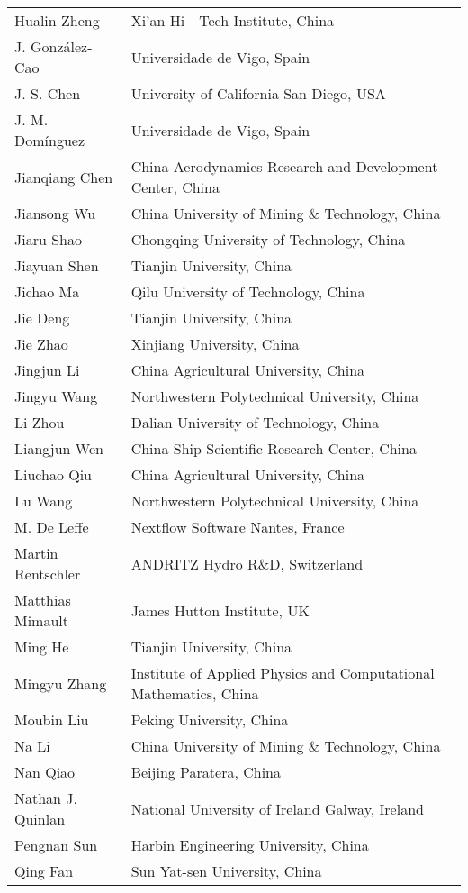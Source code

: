\begin{longtable}{ll}
Hualin Zheng&	Xi'an Hi - Tech Institute, China\\ 
J. González-Cao&	Universidade de Vigo, Spain\\ 
J. S. Chen&	University of California San Diego, USA\\ 
J. M. Domínguez&	Universidade de Vigo, Spain\\ 
Jianqiang Chen&	China Aerodynamics Research and Development Center, China\\ 
Jiansong Wu&	China University of Mining \& Technology, China\\ 
Jiaru Shao&	Chongqing University of Technology, China\\ 
Jiayuan Shen&	Tianjin University, China\\ 
Jichao Ma&	Qilu University of Technology, China\\ 
Jie Deng&	Tianjin University, China\\ 
Jie Zhao&	Xinjiang University, China\\ 
Jingjun Li&	China Agricultural University, China\\ 
Jingyu Wang&	Northwestern Polytechnical University, China\\ 
Li Zhou&	Dalian University of Technology, China\\ 
Liangjun Wen&	China Ship Scientific Research Center, China\\ 
Liuchao Qiu&	China Agricultural University, China\\ 
Lu Wang&	Northwestern Polytechnical University, China\\ 
M. De Leffe&	Nextflow Software Nantes, France\\ 
Martin Rentschler&	ANDRITZ Hydro R\&D, Switzerland\\ 
Matthias Mimault &	James Hutton Institute, UK\\ 
Ming He&	Tianjin University, China\\ 
Mingyu Zhang&	Institute of Applied Physics and Computational Mathematics, China\\ 
Moubin Liu&	Peking University, China\\ 
Na Li&	China University of Mining \& Technology, China\\ 
Nan Qiao&	Beijing Paratera, China\\
Nathan J. Quinlan &	National University of Ireland Galway, Ireland\\ 
Pengnan Sun&	Harbin Engineering University, China\\ 
Qing Fan&	Sun Yat-sen University, China\\ 

\end{longtable}
